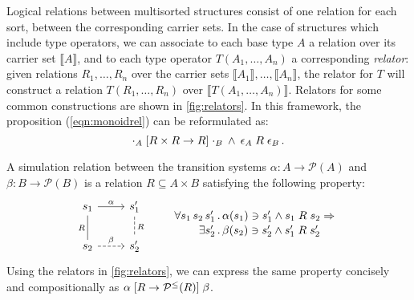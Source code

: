 Logical relations between multisorted structures
consist of one relation for each sort,
between the corresponding carrier sets.
In the case of structures which include type operators,
we can associate to each base type $A$
a relation over its carrier set $\llbracket A \rrbracket$,
and to each type operator $T(A_1, \ldots, A_n)$
a corresponding \emph{relator}:
given relations $R_1, \ldots, R_n$ over
the carrier sets $\llbracket A_1 \rrbracket, \ldots, \llbracket A_n \rrbracket$,
the relator for $T$
will construct a relation $T(R_1, \ldots, R_n)$
over $\llbracket T(A_1, \ldots, A_n) \rrbracket$.
Relators for some common constructions are shown in \ref{fig:relators}.
In this framework, the proposition (\ref{eqn:monoidrel}) can be reformulated as:
\[
  \cdot_A \mathrel{[{R \times R \rightarrow R}]} \cdot_B
  \: \wedge \:
  \epsilon_A \mathrel{R} \epsilon_B \,.
\]

\begin{example} \label{ex:simrel} %
A simulation relation
between the transition systems
$\alpha : A \rightarrow \mathcal{P}(A)$ and
$\beta : B \rightarrow \mathcal{P}(B)$
is a relation $R \subseteq A \times B$
satisfying the following property:
\[
  \begin{tikzcd}[scale=0.8]
    s_1 \arrow[r, "\alpha"]
        \arrow[d, dash, "R"'] &
    s_1' \arrow[d, dashed, dash, "R"] \\
    s_2 \arrow[r, dashed, "\beta"] &
    s_2'
  \end{tikzcd}
  \qquad
  \label{eqn:simrel}
  \begin{array}{r@{\,.\,}l}
    \forall s_1 \, s_2 \, s_1' &
      \alpha(s_1) \ni s_1' \wedge s_1 \mathrel{R} s_2 \Rightarrow
    \\[0.25ex]
    \exists s_2' &
      \beta(s_2) \ni s_2' \wedge s_1' \mathrel{R} s_2'
  \end{array}
\]
Using the relators in \ref{fig:relators},
we can express the same property
concisely and compositionally as
$
  \alpha \mathrel{[{R \rightarrow \mathcal{P}^\le(R)}]} \beta
$.
\end{example}

